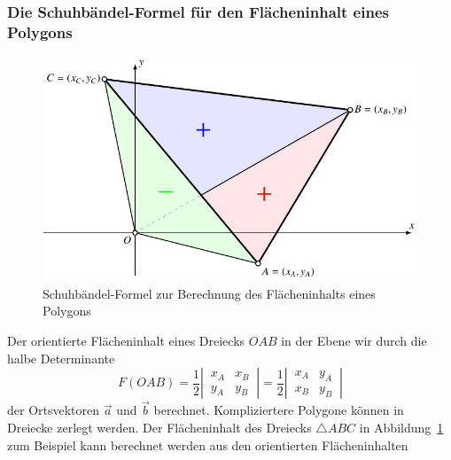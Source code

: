 \subsubsection{Die Schuhbändel-Formel für den Flächeninhalt eines Polygons}
\begin{figure}
\centering
\includegraphics{5/images/schuhbaendel.pdf}
\caption{Schuhbändel-Formel zur Berechnung des Flächeninhalts eines
Polygons
\label{skript:orientierung:schuhbaendel}}
\end{figure}
Der orientierte Flächeninhalt eines Dreiecks $OAB$ in der Ebene wir durch
die halbe Determinante
\[
F(OAB)
=
\frac12\left|\,\begin{matrix} x_A&x_B\\y_A&y_B\end{matrix}\,\right|
=
\frac12\left|\,\begin{matrix} x_A&y_A\\x_B&y_B\end{matrix}\,\right|
\]
der Ortsvektoren $\vec{a}$ und $\vec{b}$ berechnet.
Kompliziertere Polygone können in Dreiecke zerlegt werden.
Der Flächeninhalt des Dreiecks $\triangle ABC$ in
Abbildung~\ref{skript:orientierung:schuhbaendel} zum 
Beispiel kann berechnet werden aus den orientierten Flächeninhalten
